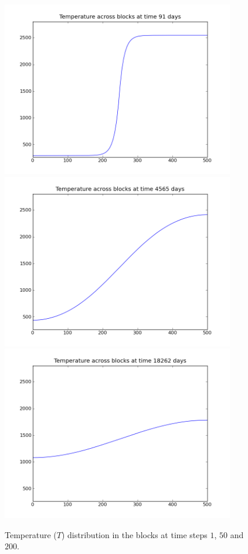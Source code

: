 \begin{figure}
\begin{center}
\includegraphics[width=4in]{figures/blockspyplot001}
\includegraphics[width=4in]{figures/blockspyplot050}
\includegraphics[width=4in]{figures/blockspyplot200}
\caption{Temperature ($T$) distribution in the blocks at time steps $1$, $50$ and $200$.}
\label{fig:onedheatout} 
\end{center}
\end{figure}

